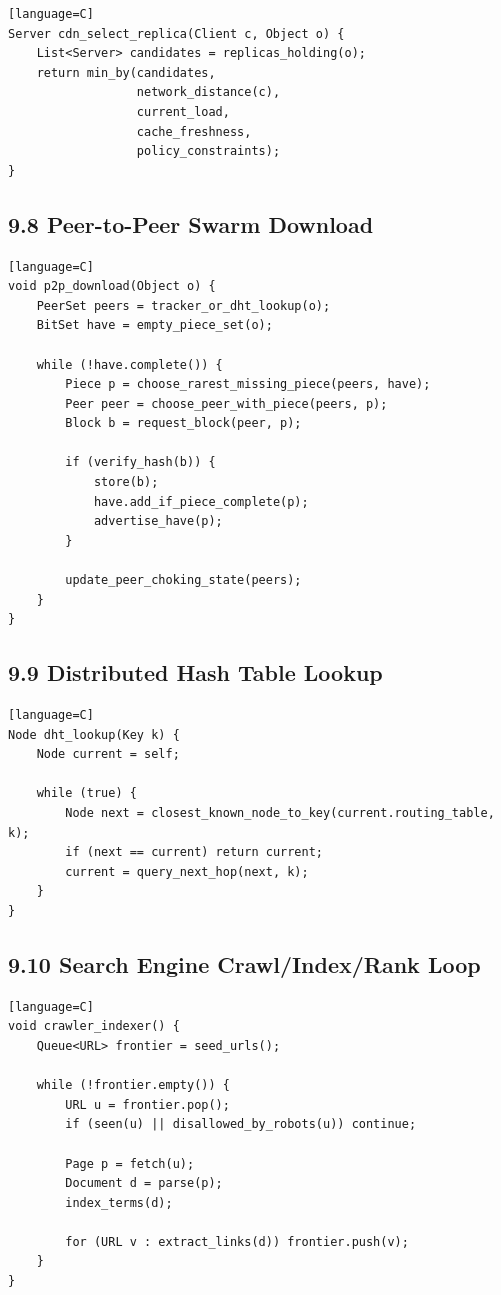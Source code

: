 \documentclass[11pt]{article}
\begin{document}
\begin{verbatim}[language=C]
Server cdn_select_replica(Client c, Object o) {
    List<Server> candidates = replicas_holding(o);
    return min_by(candidates,
                  network_distance(c),
                  current_load,
                  cache_freshness,
                  policy_constraints);
}
\end{verbatim}

\subsection{9.8 Peer-to-Peer Swarm
Download}\label{peer-to-peer-swarm-download}

\begin{verbatim}[language=C]
void p2p_download(Object o) {
    PeerSet peers = tracker_or_dht_lookup(o);
    BitSet have = empty_piece_set(o);

    while (!have.complete()) {
        Piece p = choose_rarest_missing_piece(peers, have);
        Peer peer = choose_peer_with_piece(peers, p);
        Block b = request_block(peer, p);

        if (verify_hash(b)) {
            store(b);
            have.add_if_piece_complete(p);
            advertise_have(p);
        }

        update_peer_choking_state(peers);
    }
}
\end{verbatim}

\subsection{9.9 Distributed Hash Table
Lookup}\label{distributed-hash-table-lookup}

\begin{verbatim}[language=C]
Node dht_lookup(Key k) {
    Node current = self;

    while (true) {
        Node next = closest_known_node_to_key(current.routing_table, k);
        if (next == current) return current;
        current = query_next_hop(next, k);
    }
}
\end{verbatim}

\subsection{9.10 Search Engine Crawl/Index/Rank
Loop}\label{search-engine-crawlindexrank-loop}

\begin{verbatim}[language=C]
void crawler_indexer() {
    Queue<URL> frontier = seed_urls();

    while (!frontier.empty()) {
        URL u = frontier.pop();
        if (seen(u) || disallowed_by_robots(u)) continue;

        Page p = fetch(u);
        Document d = parse(p);
        index_terms(d);

        for (URL v : extract_links(d)) frontier.push(v);
    }
}
\end{verbatim}
\end{document}

